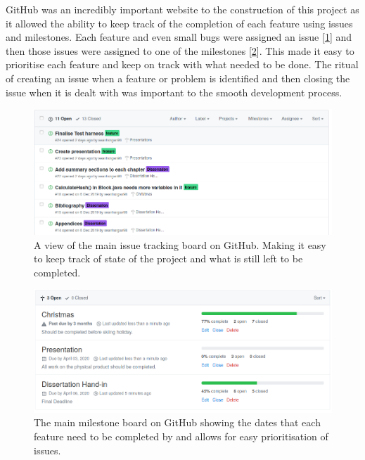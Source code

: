 \documentclass{l4proj}
\begin{document}
GitHub was an incredibly important website to the construction of this project as it allowed the ability to keep
track of the completion of each feature using issues and milestones. Each feature and even small bugs were assigned
an issue [\ref{fig:issues}] and then those issues were assigned to one of the milestones [\ref{fig:milestones}]. 
This made it easy to prioritise each feature and keep on track with what needed to be done. The ritual of creating
an issue when a feature or problem is identified and then closing the issue when it is dealt with was important to 
the smooth development process.


\begin{figure}[!ht]
    \centering
    \includegraphics[width=1\linewidth]{images/issues.png}    

    \caption{
        A view of the main issue tracking board on GitHub. Making it easy to keep track of state of the project
        and what is still left to be completed.
    }

    \label{fig:issues} 
\end{figure}
\vspace{10cm}

\begin{figure}[!ht]
    \centering
    \includegraphics[width=1\linewidth]{images/milestones.png}    

    \caption{
        The main milestone board on GitHub showing the dates that each feature need to be completed by and
        allows for easy prioritisation of issues.
    }

    \label{fig:milestones} 
\end{figure}
\end{document}
